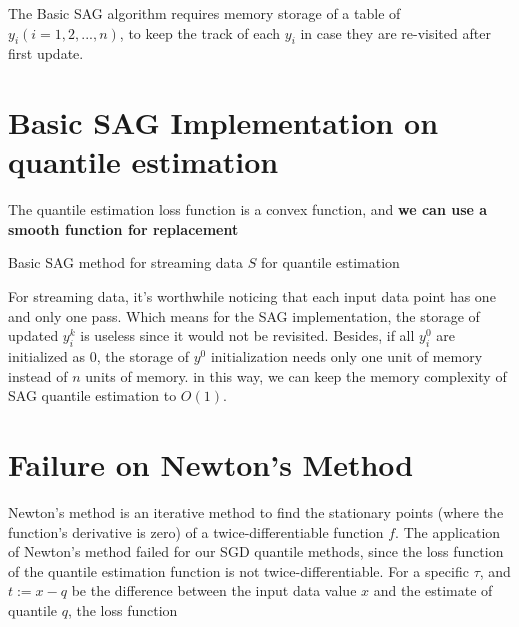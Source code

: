 The Basic SAG algorithm requires memory storage of a table of $y_i (i= 1, 2, ...,n)$, to keep the track of each $y_i$ in case they are re-visited after first update.

\section{Basic SAG Implementation on quantile estimation}

The quantile estimation loss function is a convex function, and \textbf{we can use a smooth function for replacement}
\begin{algorithm}
    \caption{Basic SAG method for streaming data $S$ for quantile estimation}\label{alg:SAG}
        \begin{algorithmic}[1]
                       
                 
            \EndFor
        \end{algorithmic}
\end{algorithm}
For streaming data, it's worthwhile noticing that each input data point has one and only one pass. Which means for the SAG implementation, the storage of updated $y_i^k$ is useless since it would not be revisited. Besides, if all $y_i^0$ are initialized as 0, the storage of $y^0$ initialization needs only one unit of memory instead of $n$ units of memory. in this way, we can keep the memory complexity of SAG quantile estimation to $O(1)$.


\section{Failure on Newton's Method}
Newton's method is an iterative method to find the stationary points (where the function's derivative is zero) of a twice-differentiable function $f$. The application of Newton's method failed for our SGD quantile methods, since the loss function of the quantile estimation function is not twice-differentiable. For a specific $\tau$, and $t := x - q$ be the difference between the input data value $x$ and the estimate of quantile $q$, the loss function 

